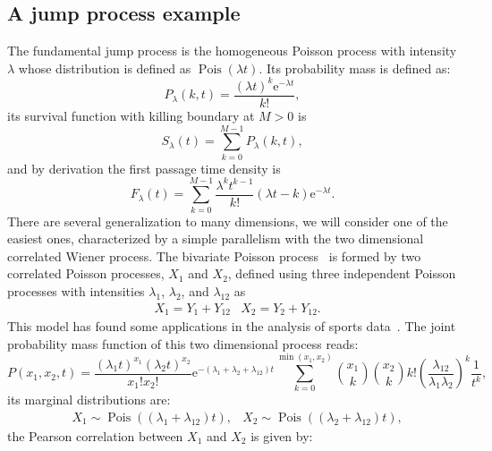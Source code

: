\documentclass[a4paper,11pt]{amsart}
\theoremstyle{remark}
\newcommand{\ee}[1]{\mathrm{e}^{#1}}
\begin{document}
  \subsection{A jump process example}
  The fundamental jump process is the homogeneous Poisson process with intensity $\lambda$ whose distribution is defined as $\operatorname{Pois}(\lambda t)$. Its probability mass is defined as:
  \begin{equation}
    \label{eq:poission1D}
    P_\lambda(k,t)=\frac{(\lambda t)^k\ee{-\lambda t}}{k!},
  \end{equation}
  its survival function with killing boundary at $M>0$ is
  \begin{equation}
    \label{eq:survival1D}
    S_\lambda(t)=\sum_{k=0}^{M-1} P_\lambda(k,t),
  \end{equation}
  and by derivation the first passage time density is
  \begin{equation}
    \label{eq:fpt_1D}
    F_\lambda(t)=\sum_{k=0}^{M-1}\frac{\lambda^k t^{k-1}}{k!}(\lambda t-k)\ee{-\lambda t}.
  \end{equation}
  There are several generalization to many dimensions, we will consider one of the easiest ones, characterized by a simple parallelism with the two dimensional correlated Wiener process. The bivariate Poisson process~\cite{holgate_estimation_1964, kotz_discrete_2005} is formed by two correlated Poisson processes, $X_1$ and $X_2$, defined using three independent Poisson processes with intensities $\lambda_1$, $\lambda_2$, and $\lambda_{12}$ as
  \begin{align}
    &X_1=Y_1+Y_{12} &X_2=Y_2+Y_{12}.
  \end{align}
  This model has found some applications in the analysis of sports data~\cite{karlis_analysis_2003}.
  The joint probability mass function of this two dimensional process reads:
  \begin{equation}
    \label{eq:poisson_join_2D}
    P(x_1,x_2,t)=\frac{(\lambda_1t)^{x_1}(\lambda_2t)^{x_2}}{x_1! x_2!}\ee{-(\lambda_1+\lambda_2+\lambda_{12})t}\sum_{k=0}^{\min(x_1,x_2)}\binom{x_1}{k}\binom{x_2}{k}k!\left(\frac{\lambda_{12}}{\lambda_1\lambda_2}\right)^k\frac{1}{t^k},
  \end{equation}
  its marginal distributions are:
  \begin{align}
    &X_1\sim\operatorname{Pois}((\lambda_1+\lambda_{12})t), &X_2\sim\operatorname{Pois}((\lambda_2+\lambda_{12})t),
  \end{align}
  the Pearson correlation between $X_1$ and $X_2$ is given by:
\end{document}

